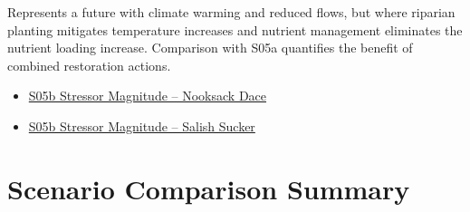 \documentclass[
  letterpaper,
  DIV=11,
  numbers=noendperiod]{scrreprt}
\providecommand{\tightlist}{%
  \setlength{\itemsep}{0pt}\setlength{\parskip}{0pt}}
\begin{document}
Represents a future with climate warming and reduced flows, but where
riparian planting mitigates temperature increases and nutrient
management eliminates the nutrient loading increase. Comparison with
S05a quantifies the benefit of combined restoration actions.

\begin{itemize}
\tightlist
\item
  \href{./sample_data/ndss_nooksack_dace/S05b_Mid\%20Century\%20with\%20Restoration.xlsx}{S05b
  Stressor Magnitude -- Nooksack Dace}
\item
  \href{./sample_data/ndss_salish_sucker/S05b_Mid\%20Century\%20with\%20Restoration.xlsx}{S05b
  Stressor Magnitude -- Salish Sucker}
\end{itemize}

\section*{Scenario Comparison
Summary}\label{scenario-comparison-summary}

\end{document}
